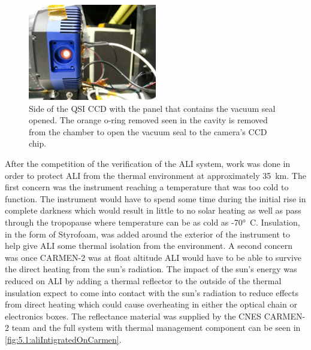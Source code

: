 \begin{figure}
    \center
    \includegraphics[trim={0 150 1200 0},clip,width=0.5\textwidth]{./Images/5-1-CCDVacuumUnsealing.jpg}
    \caption[QSI CCD Vacuum Sealing O-ring]{Side of the QSI CCD with the panel that contains the vacuum seal opened. The orange o-ring removed seen in the cavity is removed from the chamber to open the vacuum seal to the camera's CCD chip.}
    \label{fig:5.1:ccdVacuumUnsealing}
\end{figure}
 
 After the competition of the verification of the ALI system, work was done in order to protect ALI from the thermal environment at approximately 35~km. The first concern was the instrument reaching a temperature that was too cold to function. The instrument would have to spend some time during the initial rise in complete darkness which would result in little to no solar heating as well as pass through the tropopause where temperature can be as cold as -70\si{\degree C}. Insulation, in the form of Styrofoam, was added around the exterior of the instrument to help give ALI some thermal isolation from the environment. A second concern was once CARMEN-2 was at float altitude ALI would have to be able to survive the direct heating from the sun's radiation. The impact of the sun's energy was reduced on ALI by adding a thermal reflector to the outside of the thermal insulation expect to come into contact with the sun's radiation to reduce effects from direct heating which could cause overheating in either the optical chain or electronics boxes. The reflectance material was supplied by the CNES CARMEN-2 team and the full system with thermal management component can be seen in \autoref{fig:5.1:aliIntigratedOnCarmen}.
 
